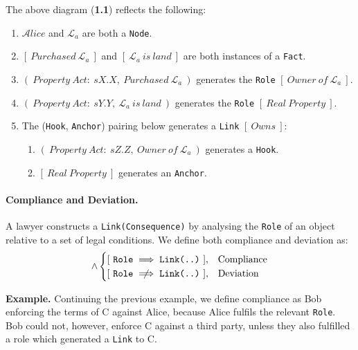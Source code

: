 \documentclass{article}
\numberwithin{equation}{section}
\newcommand{\quickexample}[1]{
\begin{tcolorbox}
	\textbf{Example.} #1
\end{tcolorbox}
}
\begin{document}
{%
The above diagram (\textbf{1.1}) reflects the following:
\begin{enumerate}
	\item $\mathcal{A}lice$ and $\mathcal{L}_a$ are both a \texttt{Node}.
	\item $[ \ Purchased \ \mathcal{L}_a \ ]$ and $[ \ \mathcal{L}_a \ is \ land \ ]$ are both instances of a \texttt{Fact}.
	\item $( \ Property \ Act: \ sX.X, \ Purchased \ \mathcal{L}_a \ )$ generates the \texttt{Role} $[ \ Owner \ of \ \mathcal{L}_a \ ]$.
	\item $( \ Property \ Act: \ sY.Y, \ \mathcal{L}_a \ is \ land \ )$ generates the \texttt{Role} $[ \ Real \ Property \ ]$.
	\item The (\texttt{Hook}, \texttt{Anchor}) pairing below generates a \texttt{Link} $[ \ Owns \ ]$:
	\begin{enumerate}
		\item $( \ Property \ Act: \ sZ.Z, \ Owner \ of \ \mathcal{L}_a \ )$ generates a \texttt{Hook}.
		\item $[ \ Real \ Property \ ]$ generates an \texttt{Anchor}.
	\end{enumerate}
\end{enumerate}

}


\pagebreak

\paragraph{Compliance and Deviation.} A lawyer constructs a \texttt{Link(Consequence)} by analysing the \texttt{Role} of an object relative to a set of legal conditions. We define both compliance and deviation as:
\begin{equation}
[ \ \exists \ \texttt{Link(Existence, Consequence)} \ ] \land 
	\begin{cases}
		[ \ \texttt{Role} \implies \texttt{Link(..)} \ ], & \text{Compliance} \\
		[ \ \texttt{Role} \centernot\implies \texttt{Link(..)} \ ], & \text{Deviation}
	\end{cases}
\end{equation}

\vspace{0.25cm}
\quickexample{
	Continuing the previous example, we define compliance as Bob enforcing the terms of C against Alice, because Alice fulfils the relevant \texttt{Role}. Bob could not, however, enforce C against a third party, unless they also fulfilled a role which generated a \texttt{Link} to C.
}


\end{document}
